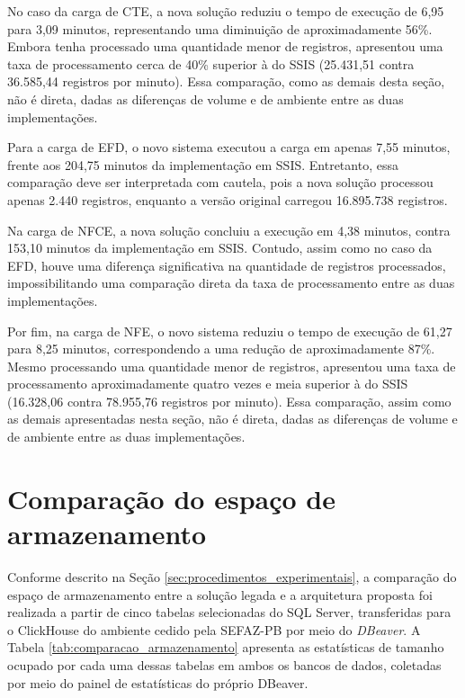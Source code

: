 No caso da carga de CTE, a nova solução reduziu o tempo de execução de 6,95 para 3,09 minutos,
representando uma diminuição de aproximadamente 56\%. Embora tenha processado uma quantidade menor de
registros, apresentou uma taxa de processamento cerca de 40\% superior à do SSIS (25.431,51 contra
36.585,44 registros por minuto). Essa comparação, como as demais desta seção, não é direta, dadas as
diferenças de volume e de ambiente entre as duas implementações.

Para a carga de EFD, o novo sistema executou a carga em apenas 7,55 minutos, frente aos 204,75 
minutos da implementação em SSIS. Entretanto, essa comparação deve ser interpretada com cautela, 
pois a nova solução processou apenas 2.440 registros, enquanto a versão original carregou 16.895.738 
registros.

Na carga de NFCE, a nova solução concluiu a execução em 4,38 minutos, contra 153,10 minutos da 
implementação em SSIS. Contudo, assim como no caso da EFD, houve uma diferença significativa na 
quantidade de registros processados, impossibilitando uma comparação direta da taxa de processamento 
entre as duas implementações.

Por fim, na carga de NFE, o novo sistema reduziu o tempo de execução de 61,27 para 8,25 minutos,
correspondendo a uma redução de aproximadamente 87\%. Mesmo processando uma quantidade menor de
registros, apresentou uma taxa de processamento aproximadamente quatro vezes e meia superior à do
SSIS (16.328,06 contra 78.955,76 registros por minuto). Essa comparação, assim como as demais
apresentadas nesta seção, não é direta, dadas as diferenças de volume e de ambiente entre as duas
implementações.


\section{Comparação do espaço de armazenamento}

Conforme descrito na Seção \ref{sec:procedimentos_experimentais}, a comparação do espaço de
armazenamento entre a solução legada e a arquitetura proposta foi realizada a partir de cinco
tabelas selecionadas do SQL Server, transferidas para o ClickHouse do ambiente cedido pela
SEFAZ-PB por meio do \textit{DBeaver}. A Tabela \ref{tab:comparacao_armazenamento} apresenta as
estatísticas de tamanho ocupado por cada uma dessas tabelas em ambos os bancos de dados,
coletadas por meio do painel de estatísticas do próprio DBeaver.

